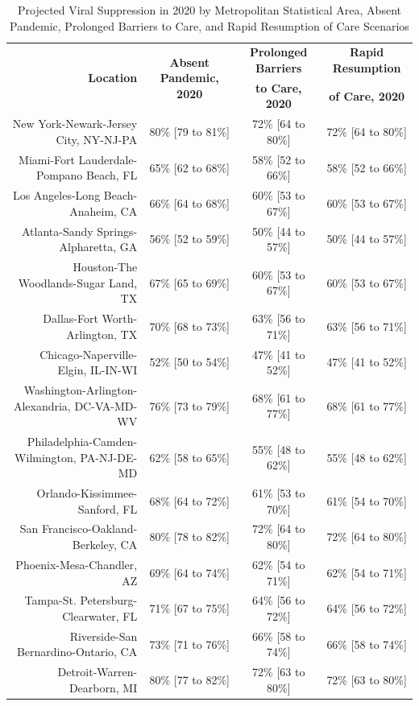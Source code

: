 \documentclass{article}
\begin{document}
\begin{table}[H]
	\caption{Projected Viral Suppression in 2020 by Metropolitan Statistical Area, Absent Pandemic, Prolonged Barriers to Care, and Rapid Resumption of Care Scenarios}
	\footnotesize
	\begin{tabular}{|r|c|c|c|}
		\hline
		\multirow{2}{*}{\textbf{Location}} & \multirow{2}{*}{\textbf{Absent Pandemic, 2020}} & \textbf{Prolonged Barriers} & \textbf{Rapid Resumption}\\
		&  & \textbf{to Care, 2020} & \textbf{of Care, 2020}\\
		\hline\hline
		New York-Newark-Jersey City, NY-NJ-PA & 80\% [79 to 81\%] & 72\% [64 to 80\%] & 72\% [64 to 80\%]\\
		Miami-Fort Lauderdale-Pompano Beach, FL & 65\% [62 to 68\%] & 58\% [52 to 66\%] & 58\% [52 to 66\%]\\
		Los Angeles-Long Beach-Anaheim, CA & 66\% [64 to 68\%] & 60\% [53 to 67\%] & 60\% [53 to 67\%]\\
		Atlanta-Sandy Springs-Alpharetta, GA & 56\% [52 to 59\%] & 50\% [44 to 57\%] & 50\% [44 to 57\%]\\
		Houston-The Woodlands-Sugar Land, TX & 67\% [65 to 69\%] & 60\% [53 to 67\%] & 60\% [53 to 67\%]\\
		Dallas-Fort Worth-Arlington, TX & 70\% [68 to 73\%] & 63\% [56 to 71\%] & 63\% [56 to 71\%]\\
		Chicago-Naperville-Elgin, IL-IN-WI & 52\% [50 to 54\%] & 47\% [41 to 52\%] & 47\% [41 to 52\%]\\
		Washington-Arlington-Alexandria, DC-VA-MD-WV & 76\% [73 to 79\%] & 68\% [61 to 77\%] & 68\% [61 to 77\%]\\
		Philadelphia-Camden-Wilmington, PA-NJ-DE-MD & 62\% [58 to 65\%] & 55\% [48 to 62\%] & 55\% [48 to 62\%]\\
		Orlando-Kissimmee-Sanford, FL & 68\% [64 to 72\%] & 61\% [53 to 70\%] & 61\% [54 to 70\%]\\
		San Francisco-Oakland-Berkeley, CA & 80\% [78 to 82\%] & 72\% [64 to 80\%] & 72\% [64 to 80\%]\\
		Phoenix-Mesa-Chandler, AZ & 69\% [64 to 74\%] & 62\% [54 to 71\%] & 62\% [54 to 71\%]\\
		Tampa-St. Petersburg-Clearwater, FL & 71\% [67 to 75\%] & 64\% [56 to 72\%] & 64\% [56 to 72\%]\\
		Riverside-San Bernardino-Ontario, CA & 73\% [71 to 76\%] & 66\% [58 to 74\%] & 66\% [58 to 74\%]\\
		Detroit-Warren-Dearborn, MI & 80\% [77 to 82\%] & 72\% [63 to 80\%] & 72\% [63 to 80\%]\\

\end{tabular}
\end{table}
\end{document}
